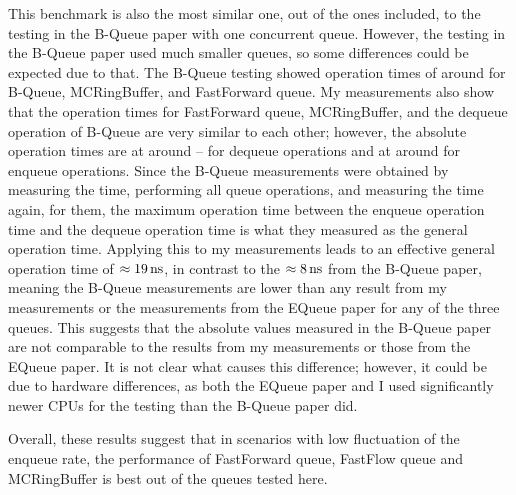 This benchmark is also the most similar one, out of the ones included, to the testing in the B-Queue paper
with one concurrent queue.
However, the testing in the B-Queue paper used much smaller queues, so some differences could be expected due to that.
The B-Queue testing showed operation times of around  for B-Queue, MCRingBuffer, and FastForward queue.
My measurements also show that the operation times for FastForward queue, MCRingBuffer, and the dequeue
operation of B-Queue are very similar to each other; however, the absolute operation times are at around
-- for dequeue operations and at around  for enqueue operations.
Since the B-Queue measurements were obtained by measuring the time, performing all queue operations, and
measuring the time again, for them, the maximum operation time between the enqueue operation time and the
dequeue operation time is what they measured as the general operation time.
Applying this to my measurements leads to an effective general operation time of $\approx\SI{19}{\nano\second}$, in
contrast to the $\approx\SI{8}{\nano\second}$ from the B-Queue paper, meaning the B-Queue measurements are lower than any
result from my measurements or the measurements from the EQueue paper for any of the three queues\cite{B-Queue,EQueue}.
This suggests that the absolute values measured in the B-Queue paper are not comparable to the results from
my measurements or those from the EQueue paper.
It is not clear what causes this difference; however, it could be due to hardware differences, as both the
EQueue paper and I used significantly newer CPUs for the testing than the B-Queue paper did.

Overall, these results suggest that in scenarios with low fluctuation of the enqueue rate, the performance of
FastForward queue, FastFlow queue and MCRingBuffer is best out of the queues tested here.
